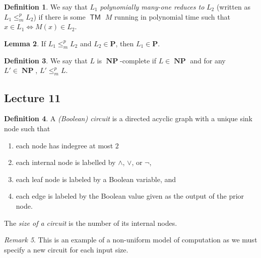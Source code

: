 \documentclass[10pt,letterpaper,cm]{nupset}
\theoremstyle{definition}
\newtheorem{definition}{Definition}[subsection]
\theoremstyle{theorem}
\newtheorem{lemma}[definition]{Lemma}
\theoremstyle{remark}
\newtheorem{remark}[definition]{Remark}
\newcommand{\1}{\mathbf{1}}
\newcommand{\0}{\vec 0}
\DeclareMathOperator{\TM}{\mathsf{TM}}
\DeclareMathOperator{\NP}{\mathbf{NP}}
\begin{document}
\begin{definition}
We say that $L_1$ \textit{polynomially many-one reduces to} $L_2$ (written as $L_1 \leq_m^p L_2$) if there is some $\TM$ $M$ running in polynomial time such that $x \in L_1 \iff M(x) \in L_2$.
\end{definition}

\begin{lemma}
If $L_1 \leq_m^p L_2$ and $L_2 \in \mathbf{P}$, then $L_1 \in \mathbf{P}$.
\end{lemma}

\begin{definition}
We say that $L$ is $\NP$-complete if $L \in \NP$ and for any $L' \in \NP$, $L' \leq_m^p L$. 
\end{definition}

\subsection{Lecture 11}

\begin{definition}
A \textit{(Boolean) circuit} is a directed acyclic graph with a unique sink node such that 
\begin{enumerate} 
\item each node has indegree at most $2$
\item each internal node is labelled by $ \land$, $\vee$, or $\neg$,
\item each leaf  node is labeled by a Boolean variable, and
\item each edge is labeled by the Boolean value given as the output of the prior node. 
\end{enumerate}
The \textit{size of a circuit} is the number of its internal nodes.
\end{definition}

\begin{remark}
This is an example of a non-uniform model of computation as we must specify a new circuit for each input size. 
\end{remark}
\end{document}
